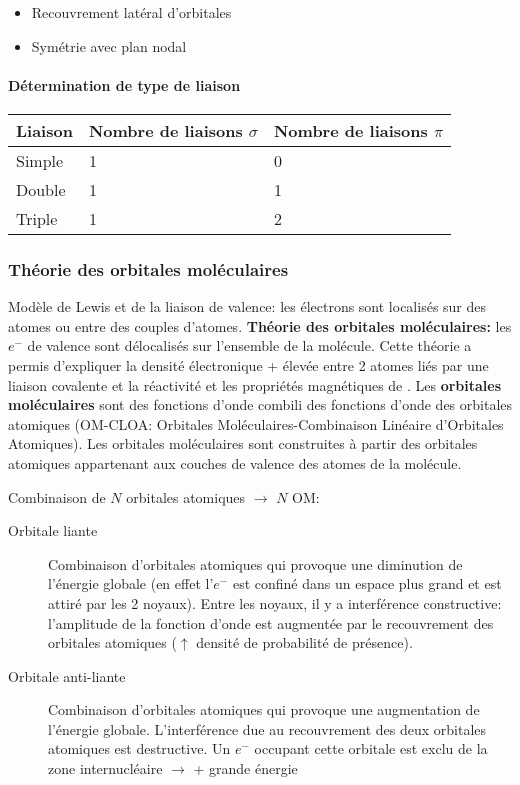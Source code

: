 \begin{itemize}
	\item Recouvrement latéral d'orbitales
	\item Symétrie avec plan nodal
\end{itemize}

\paragraph{Détermination de type de liaison}

\begin{center}
	\begin{tabular}{l|ll}
		Liaison & Nombre de liaisons $\sigma$ & Nombre de liaisons $\pi$\\
		\hline
		Simple & 1 & 0\\ %
		Double & 1 & 1\\
		Triple & 1 & 2\\
	\end{tabular}
\end{center}

\subsubsection{Théorie des orbitales moléculaires}
Modèle de Lewis et de la liaison de valence: les électrons sont localisés sur des atomes ou entre des couples d'atomes.
\textbf{Théorie des orbitales moléculaires:} les $e^-$ de valence sont délocalisés sur l'ensemble de la molécule.
Cette théorie a permis d'expliquer la densité électronique + élevée entre 2 atomes liés par une liaison covalente et la réactivité et les propriétés magnétiques de .
Les \textbf{orbitales moléculaires} sont des fonctions d'onde combili des fonctions d'onde des orbitales atomiques (OM-CLOA: Orbitales Moléculaires-Combinaison Linéaire d'Orbitales Atomiques).
Les orbitales moléculaires sont construites à partir des orbitales atomiques appartenant aux couches de valence des atomes de la molécule.

Combinaison de $N$ orbitales atomiques $\rightarrow$ $N$ OM:
\begin{description}
	\item[Orbitale liante] Combinaison d'orbitales atomiques qui provoque une diminution de l'énergie globale (en effet l'$e^-$ est confiné dans un espace plus grand et est attiré par les 2 noyaux).
		Entre les noyaux, il y a interférence constructive: l'amplitude de la fonction d'onde est augmentée par le recouvrement des orbitales atomiques ($\uparrow$ densité de probabilité de présence).

	\item[Orbitale anti-liante] Combinaison d'orbitales atomiques qui provoque une augmentation de l'énergie globale.
		L'interférence due au recouvrement des deux orbitales atomiques est destructive.
		Un $e^-$ occupant cette orbitale est exclu de la zone internucléaire $\rightarrow$ + grande énergie
\end{description}

